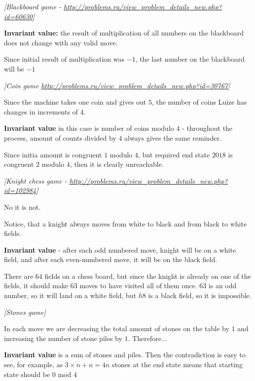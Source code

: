 

%




\noindent 
\filbreak
\begin{problem}
\textit{[Blackboard game - \url{http://problems.ru/view_problem_details_new.php?id=60630}]}

\textbf{Invariant value:} the result of multiplication of all numbers on the blackboard does not change with any valid move. 

Since initial result of multiplication was $-1$, the last number on the blackboard will be $-1$
\end{problem}
%

\begin{problem}
\textit{[Coin game \url{http://problems.ru/view_problem_details_new.php?id=30767}]}

Since the machine takes one coin and gives out $5$, the number of coins Luize has changes in increments of $4$.

\textbf{Invariant value} in this case is number of coins modulo $4$ - throughout the process, amount of counts divided by $4$ always gives the same reminder.

Since initia amount is congruent $1$ modulo $4$, but required end state $2018$ is congruent $2$ modulo $4$, then it is clearly unreachable.

 
\end{problem}
%

\begin{problem}
\textit{[Knight chess game - \url{http://problems.ru/view_problem_details_new.php?id=102984}]}

No it is not.

Notice, that a knight always moves from white to black and from black to white fields.

\textbf{Invariant value} - after each odd numbered move, knight will be on a white field, and after each even-numbered move, it will be on the black field.

There are $64$ fields on a chess board, but since the knight is already on one of the fields, it should make $63$ moves to have visited all of them once. $63$ is an odd number, so it will land on a white field, but $h8$ is a black field, so it is impossible.
\end{problem}
%
\begin{problem}
\textit{[Stones game]}

In each move we are decreasing the total amount of stones on the table by $1$ and increasing the number of stone piles by $1$. Therefore...

\textbf{Invariant value} is a sum of stones and piles. 
Then the contradiction is easy to see, for example, as $3\times n + n = 4n$ stones at the end state means that starting state should be $0$ mod $4$
\end{problem}
%

